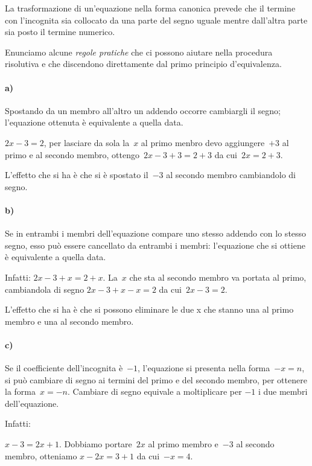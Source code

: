
\osservazione
La trasformazione di un'equazione nella forma canonica
prevede che il termine con l'incognita sia collocato da
una parte del segno uguale mentre dall'altra parte sia
posto il termine numerico.

Enunciamo alcune \emph{regole pratiche} che ci possono aiutare nella
procedura risolutiva e che discendono direttamente dal primo principio
d'equivalenza.

\paragraph{a)} Spostando da un membro all'altro un addendo occorre
cambiargli il segno; l'equazione ottenuta è
equivalente a quella data.

$2x-3=2$, per lasciare da sola la~$x$ al primo menbro devo aggiungere~$+3$ al 
primo e
al secondo membro, ottengo~$2x-3+3=2+3$ da cui~$2x=2+3$.

L'effetto che si ha è che si è spostato il~$-3$ al
secondo membro cambiandolo di segno.

\paragraph{b)} Se in entrambi i membri dell'equazione compare uno
stesso addendo con lo stesso segno, esso può essere cancellato da
entrambi i membri: l'equazione che si ottiene è
equivalente a quella data.

Infatti:
$2x-3+x=2+x$. La~$x$ che sta al secondo membro va portata al primo, cambiandola 
di segno
$2x-3+x-x=2$ da cui~$2x-3=2$.

L'effetto che si ha è che si possono eliminare le due
x che stanno una al primo membro e una al secondo membro.


\paragraph{c)} Se il coefficiente dell'incognita è~$-1$, %
l'equazione si presenta nella forma~$-x=n$, si
può cambiare di segno ai termini del primo e del secondo membro, per
ottenere la forma~$x=-n$. Cambiare di segno equivale a moltiplicare per
$-1$ i due membri dell'equazione.

Infatti:

$x-3=2x+1$. Dobbiamo portare~$2x$ al primo membro e~$-3$ al secondo membro, 
otteniamo
$x-2x=3+1$ da cui~$-x=4$.

